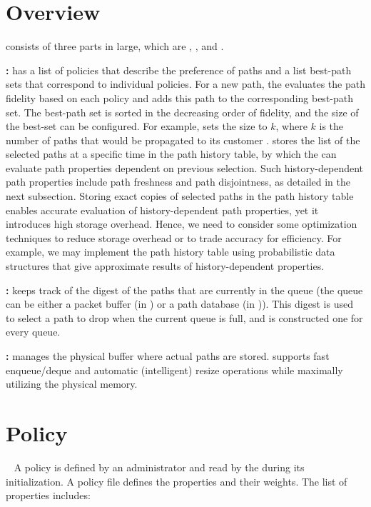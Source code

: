 \section{Overview}
\sps consists of three parts in large, which are \pse, \qs, and \sq. 

{\bf \PSE: } \PSE has a list of policies that describe the preference
of paths and a list best-path sets that correspond to individual
policies. For a new path, the \pse evaluates the path fidelity based
on each policy and adds this path to the corresponding best-path
set. The best-path set is sorted in the decreasing order of fidelity,
and the size of the best-set can be configured. For example, \BS sets
the size to $k$, where $k$ is the number of paths that would be
propagated to its customer \AD. \PSE stores the list of the selected
paths at a specific time in the path history table, by which the \pse
can evaluate path properties dependent on previous selection. Such
history-dependent path properties include path freshness and path
disjointness, as detailed in the next subsection. Storing exact copies
of selected paths in the path history table enables accurate
evaluation of history-dependent path properties, yet it introduces
high storage overhead. Hence, we need to consider some optimization
techniques to reduce storage overhead or to trade accuracy for
efficiency. For example, we may implement the path history table using
probabilistic data structures that give approximate results of
history-dependent properties.

{\bf \QS: } \QS keeps track of the digest of the paths that are currently in the queue (the queue can be either a packet buffer (in \BS) or a path database (in \PS)). This digest is used to select a path to drop when the current queue is full, and is constructed one for every queue. 

{\bf \SQ: } \sq manages the physical buffer where actual paths are stored. \sq supports fast enqueue/deque and automatic (intelligent) resize operations while maximally utilizing the physical memory. 

\section{Policy}~\label{subsec:policy}
A policy is defined by an administrator and read by the \pse during its initialization. A policy file defines the properties and their weights. The list of properties includes:

